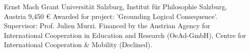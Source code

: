 {Ernst Mach Grant}
{Universit\"at Salzburg, Institut f\"ur Philosophie}
{Salzburg, Austria}
{9,450 \euro}
{Awarded for project: 'Grounding Logical Consequence'. 
	Supervisor: Prof. Julien Murzi. 
	Financed by the Austrian Agency for International Cooperation in Education and Research (OeAd-GmbH), Centre for International Cooperation \& Mobility (Declined).}
